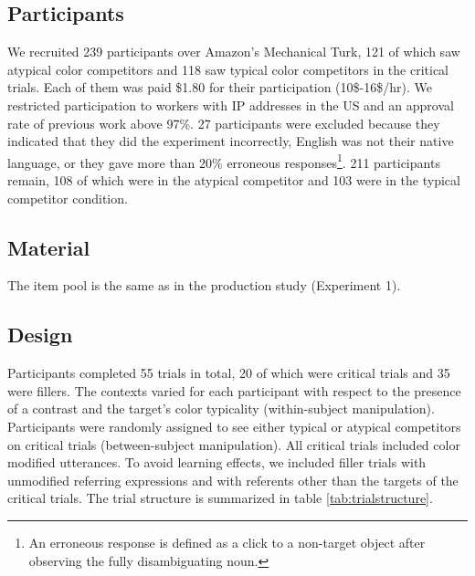 \documentclass[10pt,letterpaper]{article}
\begin{document}
\subsection{Participants}
We recruited 239 participants over Amazon's Mechanical Turk, 121 of which saw atypical color competitors and 118 saw typical color competitors in the critical trials. Each of them was paid \$1.80 for their participation (10\$-16\$/hr). We restricted participation to workers with IP addresses in the US and an approval rate of previous work above 97\%. 
27 participants were excluded because they indicated that they did the experiment incorrectly, English was not their native language, or they gave more than 20\% erroneous responses\footnote{An erroneous response is defined as a click to a non-target object after observing the fully disambiguating noun.}. 211 participants remain, 108 of which were in the atypical competitor and 103 were in the typical competitor condition. 



\subsection{Material}
The item pool is the same as in the production study (Experiment 1).


\subsection{Design}

Participants completed 55 trials in total, 20 of which were critical trials and 35 were fillers. The contexts varied for each participant with respect to the presence of a contrast and the target's color typicality (within-subject manipulation). Participants were randomly assigned to see either typical or atypical competitors on critical trials (between-subject manipulation). All critical trials included color modified utterances. 
To avoid learning effects, we included filler trials with unmodified referring expressions and with referents other than the targets of the critical trials. The trial structure is summarized in table \ref{tab:trialstructure}.
\end{document}
